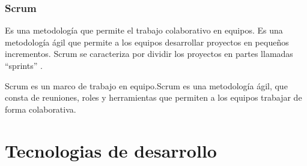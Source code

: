 \subsubsection{Scrum}
Es una metodología que permite el trabajo colaborativo en equipos. Es una metodología ágil que permite a los equipos desarrollar proyectos en pequeños incrementos. Scrum se caracteriza por dividir los proyectos en partes llamadas “sprints” . 

Scrum es un marco de trabajo en equipo.Scrum es una metodología ágil, que consta de reuniones, roles y herramientas que permiten a los equipos trabajar de forma colaborativa. 


\section{Tecnologias de desarrollo}
